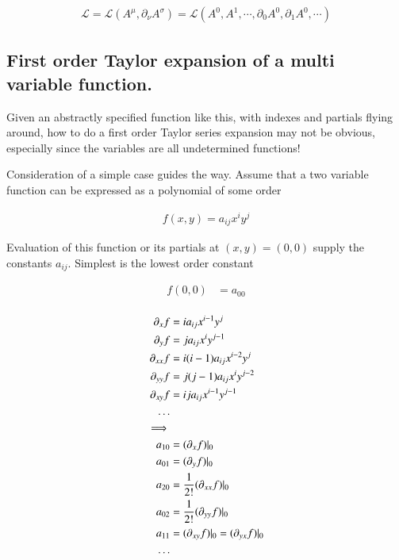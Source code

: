 \documentclass{article}
\newcommand{\LL}[0]{\mathcal{L}}
\begin{document}
\begin{align}
\LL = \LL( A^\mu, \partial_\nu A^\sigma) = \LL(A^0, A^1, \cdots, \partial_0 A^0, \partial_1 A^0, \cdots )
\end{align}

\subsection{ First order Taylor expansion of a multi variable function. }

Given an abstractly specified function like this, with indexes and partials flying around, how to do a first order Taylor series expansion may not be obvious, especially since the variables are all undetermined functions!

Consideration of a simple case guides the way.  Assume that a two variable function can be expressed as a polynomial of some order

\begin{align*}
f(x,y) = a_{i j} x^i y^j
\end{align*}

Evaluation of this function or its partials at $(x,y) = (0,0)$ supply the constants $a_{i j}$.  Simplest is the lowest order constant

\begin{align*}
f(0,0) &= a_{0 0} \\
\end{align*}

\begin{align*}
\partial_x f &= i a_{i j} x^{i-1} y^j \\
\partial_y f &= j a_{i j} x^{i} y^{j-1} \\
\partial_{xx} f &= i(i-1) a_{i j} x^{i-2} y^j \\
\partial_{yy} f &= j(j-1) a_{i j} x^{i} y^{j-2} \\
\partial_{xy} f &= i j a_{i j} x^{i-1} y^{j-1} \\
\hdots \\
\implies \\
a_{1 0} &= (\partial_x f) \vert_0 \\
a_{0 1} &= (\partial_y f) \vert_0 \\
a_{2 0} &= \frac{1}{2!} (\partial_{xx} f) \vert_0 \\
a_{0 2} &= \frac{1}{2!} (\partial_{yy} f) \vert_0 \\
a_{1 1} &= (\partial_{xy} f) \vert_0 = (\partial_{yx} f) \vert_0 \\
\hdots
\end{align*}
\end{document}
